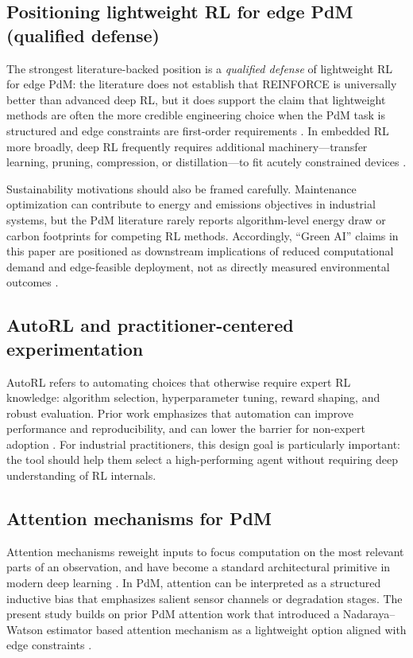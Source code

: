 \documentclass[refree,sn-basic]{sn-jnl} %
\begin{document}
\subsection{Positioning lightweight RL for edge PdM (qualified defense)}
The strongest literature-backed position is a \emph{qualified defense} of lightweight RL for edge PdM: the literature does not establish that REINFORCE is universally better than advanced deep RL, but it does support the claim that lightweight methods are often the more credible engineering choice when the PdM task is structured and edge constraints are first-order requirements \cite{Compare2020, Njor2024, Pandey2023}. In embedded RL more broadly, deep RL frequently requires additional machinery---transfer learning, pruning, compression, or distillation---to fit acutely constrained devices \cite{Jang2020, Szydlo2022, Xu2022}.

Sustainability motivations should also be framed carefully. Maintenance optimization can contribute to energy and emissions objectives in industrial systems, but the PdM literature rarely reports algorithm-level energy draw or carbon footprints for competing RL methods. Accordingly, ``Green AI'' claims in this paper are positioned as downstream implications of reduced computational demand and edge-feasible deployment, not as directly measured environmental outcomes \cite{Banyai2021, Banyai2022, JasiulewiczKaczmarek2024}.

\subsection{AutoRL and practitioner-centered experimentation}
AutoRL refers to automating choices that otherwise require expert RL knowledge: algorithm selection, hyperparameter tuning, reward shaping, and robust evaluation. Prior work emphasizes that automation can improve performance and reproducibility, and can lower the barrier for non-expert adoption \cite{Faust2019EvolvingRewards, Mussi2023ARLO}. For industrial practitioners, this design goal is particularly important: the tool should help them select a high-performing agent without requiring deep understanding of RL internals.

\subsection{Attention mechanisms for PdM}
Attention mechanisms reweight inputs to focus computation on the most relevant parts of an observation, and have become a standard architectural primitive in modern deep learning \cite{Vaswani2017}. In PdM, attention can be interpreted as a structured inductive bias that emphasizes salient sensor channels or degradation stages. The present study builds on prior PdM attention work that introduced a Nadaraya--Watson estimator based attention mechanism as a lightweight option aligned with edge constraints \cite{Siraskar2024}.
\end{document}
